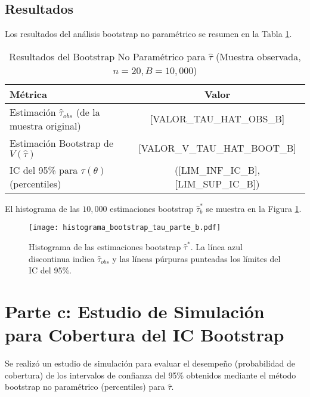 \documentclass[11pt,a4paper]{article}
\begin{document}
\subsection{Resultados}
Los resultados del análisis bootstrap no paramétrico se resumen en la Tabla \ref{tab:boot_results_b}.

\begin{table}[H]
    \centering
    \caption{Resultados del Bootstrap No Paramétrico para $\hat{\tau}$ (Muestra observada, $n=20, B=10,000$)}
    \label{tab:boot_results_b}
    \begin{tabular}{lc}
        \toprule
        Métrica & Valor \\
        \midrule
        Estimación $\hat{\tau}_{obs}$ (de la muestra original) & [VALOR_TAU_HAT_OBS_B] \\
        Estimación Bootstrap de $V(\hat{\tau})$ & [VALOR_V_TAU_HAT_BOOT_B] \\
        IC del 95\% para $\tau(\theta)$ (percentiles) & ([LIM_INF_IC_B], [LIM_SUP_IC_B]) \\
        \bottomrule
    \end{tabular}
\end{table}

El histograma de las $10,000$ estimaciones bootstrap $\hat{\tau}_b^*$ se muestra en la Figura \ref{fig:boot_hist_b}.

\begin{figure}[H]
    \centering
    \texttt{[image: histograma\_bootstrap\_tau\_parte\_b.pdf]}
    \caption{Histograma de las estimaciones bootstrap $\hat{\tau}^*$. La línea azul discontinua indica $\hat{\tau}_{obs}$ y las líneas púrpuras punteadas los límites del IC del 95\%.}
    \label{fig:boot_hist_b}
\end{figure}



\section{Parte c: Estudio de Simulación para Cobertura del IC Bootstrap}
Se realizó un estudio de simulación para evaluar el desempeño (probabilidad de cobertura) de los intervalos de confianza del 95\% obtenidos mediante el método bootstrap no paramétrico (percentiles) para $\hat{\tau}$.
\end{document}
